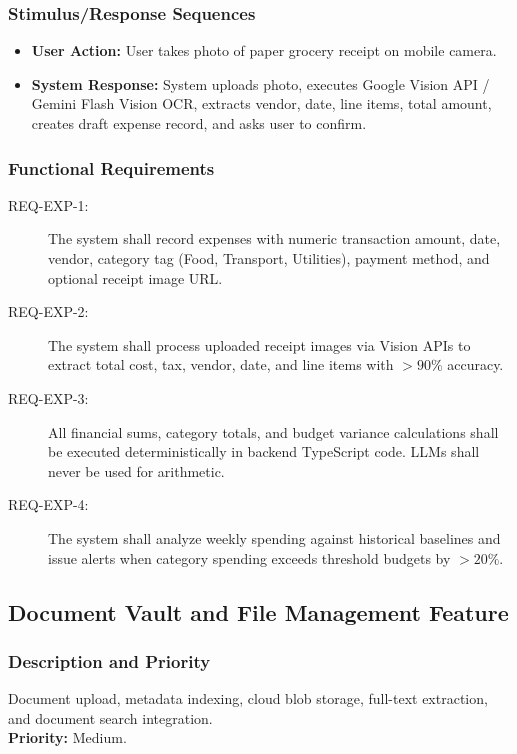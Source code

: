 \documentclass[11pt,a4paper]{article}
\begin{document}
\subsubsection{Stimulus/Response Sequences}
\begin{itemize}
    \item \textbf{User Action:} User takes photo of paper grocery receipt on mobile camera.
    \item \textbf{System Response:} System uploads photo, executes Google Vision API / Gemini Flash Vision OCR, extracts vendor, date, line items, total amount, creates draft expense record, and asks user to confirm.
\end{itemize}

\subsubsection{Functional Requirements}
\begin{description}
    \item[REQ-EXP-1:] The system shall record expenses with numeric transaction amount, date, vendor, category tag (Food, Transport, Utilities), payment method, and optional receipt image URL.
    \item[REQ-EXP-2:] The system shall process uploaded receipt images via Vision APIs to extract total cost, tax, vendor, date, and line items with $>90\%$ accuracy.
    \item[REQ-EXP-3:] All financial sums, category totals, and budget variance calculations shall be executed deterministically in backend TypeScript code. LLMs shall never be used for arithmetic.
    \item[REQ-EXP-4:] The system shall analyze weekly spending against historical baselines and issue alerts when category spending exceeds threshold budgets by $>20\%$.
\end{description}

\subsection{Document Vault and File Management Feature}
\subsubsection{Description and Priority}
Document upload, metadata indexing, cloud blob storage, full-text extraction, and document search integration. \\
\textbf{Priority:} Medium.
\end{document}
